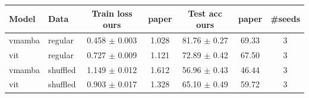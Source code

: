 \begin{tabular}{llccccc}
\toprule
Model & Data & Train loss ours & paper & Test acc ours & paper & #seeds \\
\midrule
vmamba & regular & 0.458 $\pm$ 0.003 & 1.028 & 81.76 $\pm$ 0.27 & 69.33 & 3 \\
vit & regular & 0.727 $\pm$ 0.009 & 1.121 & 72.89 $\pm$ 0.42 & 67.50 & 3 \\
vmamba & shuffled & 1.149 $\pm$ 0.012 & 1.612 & 56.96 $\pm$ 0.43 & 46.44 & 3 \\
vit & shuffled & 0.903 $\pm$ 0.017 & 1.328 & 65.10 $\pm$ 0.49 & 59.72 & 3 \\
\bottomrule
\end{tabular}
